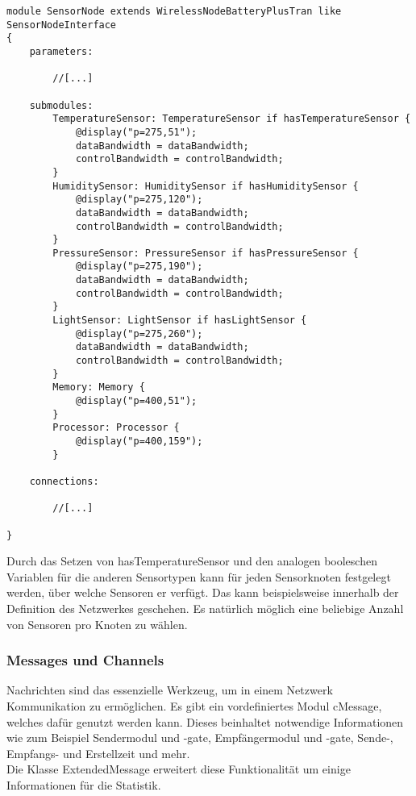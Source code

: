 \begin{minipage}{\textwidth}
\begin{lstlisting}[language=ned,caption={SensorNode mit den neu definierten Modulen},label=lst:SensorNode]
module SensorNode extends WirelessNodeBatteryPlusTran like SensorNodeInterface
{
    parameters:
    
        //[...]

    submodules:
        TemperatureSensor: TemperatureSensor if hasTemperatureSensor {
            @display("p=275,51");
            dataBandwidth = dataBandwidth;
            controlBandwidth = controlBandwidth;
        }
        HumiditySensor: HumiditySensor if hasHumiditySensor {
            @display("p=275,120");
            dataBandwidth = dataBandwidth;
            controlBandwidth = controlBandwidth;
        }
        PressureSensor: PressureSensor if hasPressureSensor {
            @display("p=275,190");
            dataBandwidth = dataBandwidth;
            controlBandwidth = controlBandwidth;
        }
        LightSensor: LightSensor if hasLightSensor {
            @display("p=275,260");
            dataBandwidth = dataBandwidth;
            controlBandwidth = controlBandwidth;
        }
        Memory: Memory {
            @display("p=400,51");
        }
        Processor: Processor {
            @display("p=400,159");
        }
        
    connections:
    
        //[...]
        
}        
\end{lstlisting}
\end{minipage}

Durch das Setzen von hasTemperatureSensor und den analogen booleschen Variablen für die anderen Sensortypen kann für jeden Sensorknoten festgelegt werden, über welche Sensoren er verfügt. Das kann beispielsweise innerhalb der Definition des Netzwerkes geschehen. Es natürlich möglich eine beliebige Anzahl von Sensoren pro Knoten zu wählen.

\subsubsection{Messages und Channels}

Nachrichten sind das essenzielle Werkzeug, um in einem Netzwerk Kommunikation zu ermöglichen. Es gibt ein vordefiniertes Modul cMessage, welches dafür genutzt werden kann. Dieses beinhaltet notwendige Informationen wie zum Beispiel Sendermodul und -gate, Empfängermodul und -gate, Sende-, Empfangs- und Erstellzeit und mehr.\\
Die Klasse ExtendedMessage erweitert diese Funktionalität um einige Informationen für die Statistik.

